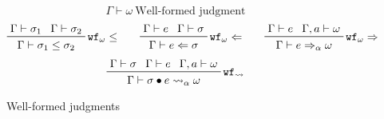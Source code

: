 \documentclass[letterpaper]{article}
\newcommand{\utv}{\alpha}             %
\begin{document}
\begin{figure}
  $$ \boxed{\Gamma\vdash\omega}\ \textrm{Well-formed judgment} $$
  $$ \prftree[r]{$\mathtt{wf_\omega \leq}$}
             {\prfassumption{\Gamma\vdash\sigma_1}}{\prfassumption{\Gamma\vdash\sigma_2}}
             {\Gamma\vdash\sigma_1\leq\sigma_2}\qquad
     \prftree[r]{$\mathtt{wf_\omega\Leftarrow}$}
             {\prfassumption{\Gamma\vdash e}}{\prfassumption{\Gamma\vdash\sigma}}
             {\Gamma\vdash e\Leftarrow\sigma}\qquad
     \prftree[r]{$\mathtt{wf_\omega\Rightarrow}$}
             {\prfassumption{\Gamma\vdash e}}{\prfassumption{\Gamma,a\vdash\omega}}
             {\Gamma\vdash e\Rightarrow_\utv\omega} $$
  $$ \prftree[r]{$\mathtt{wf_\rightsquigarrow}$}
             {\prfassumption{\Gamma\vdash\sigma}}{\prfassumption{\Gamma\vdash e}}
             {\prfassumption{\Gamma,a\vdash\omega}}
             {\Gamma\vdash\sigma\bullet e\rightsquigarrow_\utv\omega} $$
  \caption{Well-formed judgments}
  \label{f:wf:judgments}
\end{figure}
\end{document}
